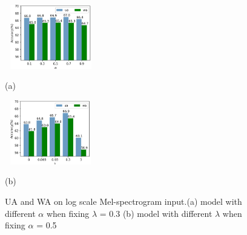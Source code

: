 \documentclass{article}
\begin{document}
\begin{figure}[htb]	
	\begin{minipage}[b]{0.48\linewidth}
		\label{fig:metric_lambda_alpha_a}
		\centering
		\centerline{\includegraphics[width=4cm, height=2.8cm]{fig4_alpha.png}}
		\centerline{\small(a)}\medskip
		
	\end{minipage}
	\hfill
	\begin{minipage}[b]{.48\linewidth}
		\centering
		\centerline{\includegraphics[width=4cm,height=2.8cm]{fig4_lambda.png}}
		\centerline{\small(b)  }\medskip
		\label{fig:metric_lambda_alpha_b}
	\end{minipage}
	\caption{UA and WA on log scale Mel-spectrogram input.(a) model with different $\alpha$ when fixing $\lambda$ = 0.3 (b) model with different $\lambda$ when fixing $\alpha$ = 0.5}
	\label{fig:metric_lambda_alpha}
	\vspace{-10pt}
\end{figure}
\end{document}
